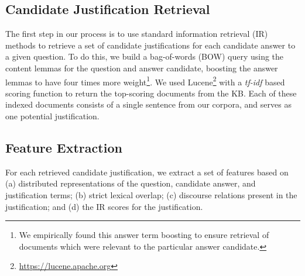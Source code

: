 %

\subsection{Candidate Justification Retrieval}
\label{sec:justretrieval}
The first step in our process is to use standard information retrieval (IR) methods to retrieve a set of candidate justifications for each candidate answer to a given question.  To do this, we build a bag-of-words (BOW) query using the content lemmas for the question and answer candidate, boosting the answer lemmas to have four times more weight\footnote{We empirically found this answer term boosting to ensure retrieval of documents which were relevant to the particular answer candidate.}.  We used Lucene\footnote{\url{https://lucene.apache.org}} with a \emph{tf-idf} based scoring function to return the top-scoring documents from the KB.  Each of these indexed documents consists of a single sentence from our corpora, and serves as one potential justification.  

\subsection{Feature Extraction}
\label{sec:features}
For each retrieved candidate justification, we extract a set of features based on (a) distributed representations of the question, candidate answer, and justification terms; (b) strict lexical overlap; (c) discourse relations present in the justification; and (d) the IR scores for the justification.

